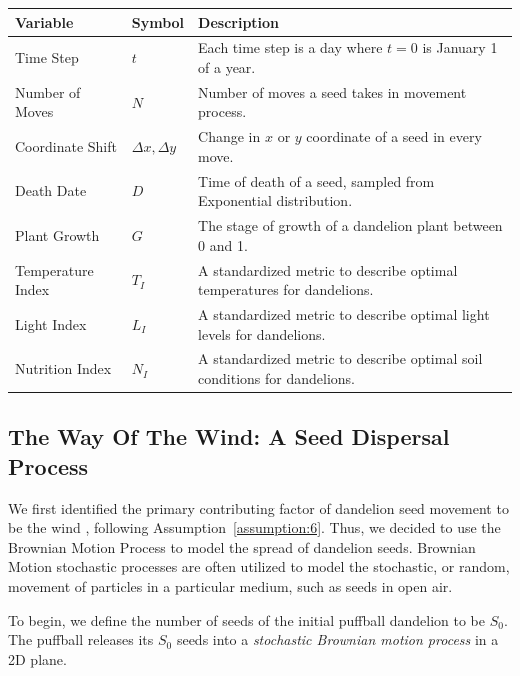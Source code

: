 \begin{table}[h]
\renewcommand{\arraystretch}{1.3}
    \begin{tabularx}{\textwidth}{p{} lX}
    \toprule
    \textbf{Variable}           & \textbf{Symbol} & \textbf{Description}  \\ \midrule
    \raggedright Time Step & $t$  & Each time step is a day where \(t = 0\) is January 1 of a year. \\
    \rowcolor{gray!15}
    \raggedright Number of Moves & $N$  & Number of moves a seed takes in movement process. \\
    Coordinate Shift & $\Delta x, \Delta y$    &  Change in \(x\) or \(y\) coordinate of a seed in every move.  \\
    \rowcolor{gray!15} \raggedright  Death Date & $D$               &  Time of death of a seed, sampled from Exponential distribution.  \\
    \raggedright Plant Growth & $G$ & The stage of growth of a dandelion plant between 0 and 1. \\
    \rowcolor{gray!15} \raggedright Temperature Index & $T_I$ & A standardized metric to describe optimal temperatures for dandelions. \\
    \raggedright Light Index & $L_I$ & A standardized metric to describe optimal light levels for dandelions. \\
    \rowcolor{gray!15} \raggedright Nutrition Index & $N_I$ & A standardized metric to describe optimal soil conditions for dandelions. \\
    \bottomrule
    \end{tabularx}
\end{table}

\subsection{The Way Of The Wind: A Seed Dispersal Process}

We first identified the primary contributing factor of dandelion seed movement to be the wind \cite{wang_separating_2021}, following Assumption~\ref{assumption:6}. Thus, we decided to use the Brownian Motion Process to model the spread of dandelion seeds. Brownian Motion stochastic processes are often utilized to model the stochastic, or random, movement of particles in a particular medium, such as seeds in open air.

To begin, we define the number of seeds of the initial puffball dandelion to be \(S_0\). The puffball releases its \(S_0\) seeds into a \textit{stochastic Brownian motion process} in a 2D plane. 

